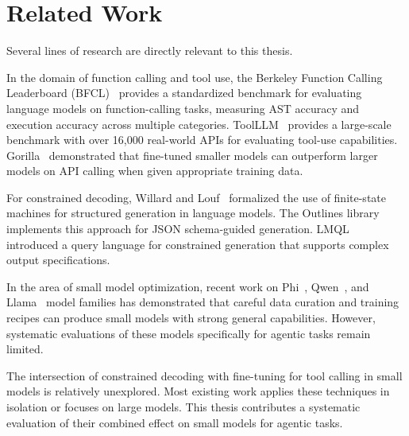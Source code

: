 \section{Related Work}

Several lines of research are directly relevant to this thesis.

In the domain of function calling and tool use, the Berkeley Function Calling Leaderboard (BFCL)~\cite{bfcl2024} provides a standardized benchmark for evaluating language models on function-calling tasks, measuring AST accuracy and execution accuracy across multiple categories. ToolLLM~\cite{qin2024toolllm} provides a large-scale benchmark with over 16,000 real-world APIs for evaluating tool-use capabilities. Gorilla~\cite{patil2023gorilla} demonstrated that fine-tuned smaller models can outperform larger models on API calling when given appropriate training data.

For constrained decoding, Willard and Louf~\cite{willard2023efficient} formalized the use of finite-state machines for structured generation in language models. The Outlines library~\cite{outlines2024} implements this approach for JSON schema-guided generation. LMQL~\cite{beurer2024guidance} introduced a query language for constrained generation that supports complex output specifications.

In the area of small model optimization, recent work on Phi~\cite{abdin2024phi}, Qwen~\cite{qwen2024qwen25}, and Llama~\cite{llama2024llama32} model families has demonstrated that careful data curation and training recipes can produce small models with strong general capabilities. However, systematic evaluations of these models specifically for agentic tasks remain limited.

The intersection of constrained decoding with fine-tuning for tool calling in small models is relatively unexplored. Most existing work applies these techniques in isolation or focuses on large models. This thesis contributes a systematic evaluation of their combined effect on small models for agentic tasks.
